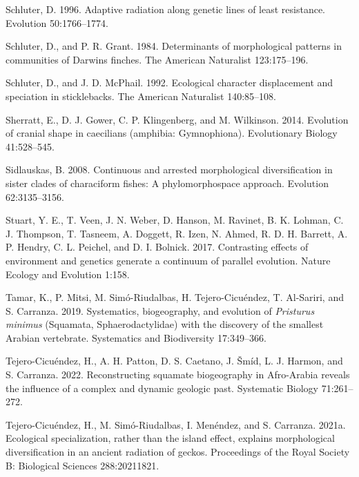 \documentclass[
  11pt,
]{article}
\begin{document}
\leavevmode\hypertarget{ref-Schluter1996}{}%
Schluter, D. 1996. Adaptive radiation along genetic lines of least
resistance. Evolution 50:1766--1774.

\leavevmode\hypertarget{ref-Schluter1984}{}%
Schluter, D., and P. R. Grant. 1984. Determinants of morphological
patterns in communities of Darwins finches. The American Naturalist
123:175--196.

\leavevmode\hypertarget{ref-Schluter1992}{}%
Schluter, D., and J. D. McPhail. 1992. Ecological character displacement
and speciation in sticklebacks. The American Naturalist 140:85--108.

\leavevmode\hypertarget{ref-Sherratt2014}{}%
Sherratt, E., D. J. Gower, C. P. Klingenberg, and M. Wilkinson. 2014.
Evolution of cranial shape in caecilians (amphibia: Gymnophiona).
Evolutionary Biology 41:528--545.

\leavevmode\hypertarget{ref-Sidlauskas2008}{}%
Sidlauskas, B. 2008. Continuous and arrested morphological
diversification in sister clades of characiform fishes: A
phylomorphospace approach. Evolution 62:3135--3156.

\leavevmode\hypertarget{ref-Stuart2017}{}%
Stuart, Y. E., T. Veen, J. N. Weber, D. Hanson, M. Ravinet, B. K.
Lohman, C. J. Thompson, T. Tasneem, A. Doggett, R. Izen, N. Ahmed, R. D.
H. Barrett, A. P. Hendry, C. L. Peichel, and D. I. Bolnick. 2017.
Contrasting effects of environment and genetics generate a continuum of
parallel evolution. Nature Ecology and Evolution 1:158.

\leavevmode\hypertarget{ref-Tamar2019}{}%
Tamar, K., P. Mitsi, M. Simó-Riudalbas, H. Tejero-Cicuéndez, T.
Al-Sariri, and S. Carranza. 2019. Systematics, biogeography, and
evolution of \emph{Pristurus minimus} (Squamata, Sphaerodactylidae) with
the discovery of the smallest Arabian vertebrate. Systematics and
Biodiversity 17:349--366.

\leavevmode\hypertarget{ref-Tejero-Cicuendez2022}{}%
Tejero-Cicuéndez, H., A. H. Patton, D. S. Caetano, J. Šmíd, L. J.
Harmon, and S. Carranza. 2022. Reconstructing squamate biogeography in
Afro-Arabia reveals the influence of a complex and dynamic geologic
past. Systematic Biology 71:261--272.

\leavevmode\hypertarget{ref-Tejero-Cicuendez2021}{}%
Tejero-Cicuéndez, H., M. Simó-Riudalbas, I. Menéndez, and S. Carranza.
2021a. Ecological specialization, rather than the island effect,
explains morphological diversification in an ancient radiation of
geckos. Proceedings of the Royal Society B: Biological Sciences
288:20211821.
\end{document}
